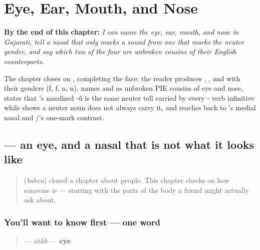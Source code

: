 
\chapter{Eye, Ear, Mouth, and Nose}
\label{ch:gu-face-parts}

\begin{chapteropening}
\textbf{By the end of this chapter:} \emph{I can name the eye, ear, mouth, and nose in Gujarati, tell a nasal that only marks a sound from one that marks the neuter gender, and say which two of the four are unbroken cousins of their English counterparts.}

The chapter closes on , completing the face: the reader produces , ,  and  with their genders (f, f, n, n), names  and  as unbroken PIE cousins of eye and nose, states that 's nasalized -ũ is the same neuter tell carried by every - verb infinitive while  shows a neuter noun does not always carry it, and reaches back to 's medial nasal and /'s one-mark contrast.
\end{chapteropening}

\section[āṅkh]{ — an eye, and a nasal that is not what it looks like}

\label{lesson:GU-C12-aankh}



\begin{quote}
\textbf{} (\emph{bahen}) closed a chapter about people. This chapter checks on how someone is — starting with the parts of the body a friend might actually ask about.
\end{quote}

\subsection*{You'll want to know first — one word}
\begin{quote}
\textbf{} — \emph{āṅkh} — \textbf{eye}
\end{quote}

